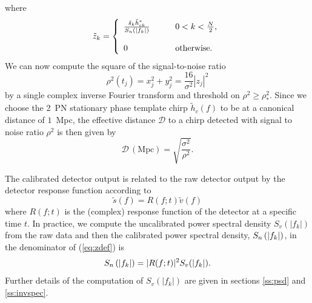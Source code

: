 where
\begin{equation}
\label{eq:ztildedef}
\tilde{z}_k = \left\{
\begin{array}{ll}
\frac{\tilde{s}_k \tilde{h}_{ck}^\ast}{S_n\left(\left|f_{k}\right|\right)} 
  \quad\quad & 0 < k < \frac{N}{2},\\
\\
0 & \mathrm{otherwise}.
\end{array}
\right.
\end{equation}
We can now compute the square of the signal-to-noise ratio
\begin{equation}
\rho^2(t_j) = x_j^2 + y_j^2 = \frac{16}{\sigma^2}|z_j|^2
\end{equation}
by a single complex inverse Fourier transform and threshold on 
$\rho^2 \ge \rho^2_\ast$.  Since we choose the 2~PN stationary phase template
chirp $\tilde{h}_c(f)$ to be at a canonical distance of $1$~Mpc, the effective
distance $\mathcal{D}$ to a chirp detected with signal to noise ratio $\rho^2$
is then given by
\begin{equation}
\mathcal{D}\,(\mathrm{Mpc})= \sqrt{\frac{\sigma^2}{\rho^2}}.
\end{equation}

The calibrated detector output is related to the raw detector output by the
detector response function according to
\begin{equation}
\tilde{s}(f) = R(f;t) \tilde{v}(f)
\end{equation}
where $R(f;t)$ is the (complex) response function of the detector at a
specific time $t$\cite{calpaper}. In practice, we compute the uncalibrated
power spectral density $S_v(|f_k|)$ from the raw data and then the calibrated
power spectral density, $S_n\left(\left|f_{k}\right|\right)$, in the denominator of (\ref{eq:zdef}) is
\begin{equation}
S_n\left(\left|f_{k}\right|\right) = |R(f;t)|^2 S_v(|f_k|).
\end{equation}
Further details of the computation of $S_v(|f_k|)$ are given in sections
\ref{ss:psd} and \ref{ss:invspec}.

